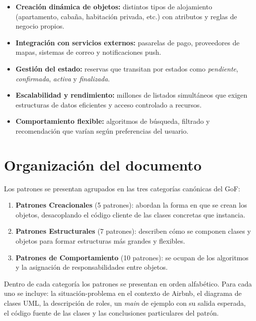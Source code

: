 \begin{itemize}[leftmargin=1.5cm]
  \item \textbf{Creación dinámica de objetos:} distintos tipos de alojamiento
        (apartamento, cabaña, habitación privada, etc.) con atributos y reglas
        de negocio propios.
  \item \textbf{Integración con servicios externos:} pasarelas de pago, proveedores
        de mapas, sistemas de correo y notificaciones push.
  \item \textbf{Gestión del estado:} reservas que transitan por estados como
        \textit{pendiente}, \textit{confirmada}, \textit{activa} y \textit{finalizada}.
  \item \textbf{Escalabilidad y rendimiento:} millones de listados simultáneos que
        exigen estructuras de datos eficientes y acceso controlado a recursos.
  \item \textbf{Comportamiento flexible:} algoritmos de búsqueda, filtrado y
        recomendación que varían según preferencias del usuario.
\end{itemize}

\section*{Organización del documento}

Los patrones se presentan agrupados en las tres categorías canónicas del GoF:

\begin{enumerate}[leftmargin=1.5cm]
  \item \textbf{Patrones Creacionales} (5 patrones): abordan la forma en que se
        crean los objetos, desacoplando el código cliente de las clases concretas
        que instancia.
  \item \textbf{Patrones Estructurales} (7 patrones): describen cómo se componen
        clases y objetos para formar estructuras más grandes y flexibles.
  \item \textbf{Patrones de Comportamiento} (10 patrones): se ocupan de los
        algoritmos y la asignación de responsabilidades entre objetos.
\end{enumerate}

Dentro de cada categoría los patrones se presentan en orden alfabético. Para cada uno
se incluye: la situación-problema en el contexto de Airbnb, el diagrama de clases UML,
la descripción de roles, un \textit{main} de ejemplo con su salida esperada, el código
fuente de las clases y las conclusiones particulares del patrón.

\bigskip